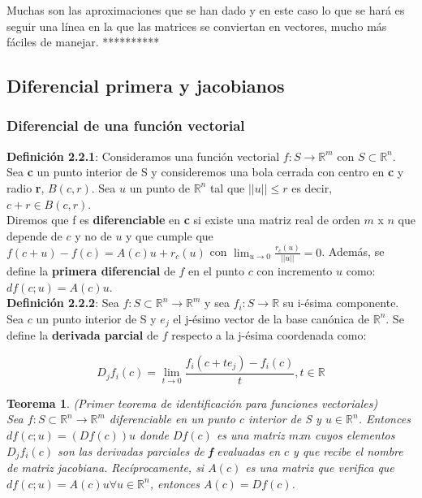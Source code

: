 \documentclass{article}
\theoremstyle{theorem-style}  %
\newtheorem{theorem}{Teorema}[section]  %
\theoremstyle{definition}
\theoremstyle{example-style}
\begin{document}
Muchas son las aproximaciones que se han dado y en este caso lo que se hará es seguir una línea en la que las matrices se conviertan en vectores, mucho más fáciles de manejar. **********

\subsection{Diferencial primera y jacobianos}

\subsubsection{Diferencial de una función vectorial}
\textbf{Definición 2.2.1}: Consideramos una función vectorial $f: S \rightarrow \mathbb{R}^m$ con $S\subset \mathbb{R}^n$. Sea \textbf{c} un punto interior de S y consideremos una bola cerrada con centro en \textbf{c} y radio \textbf{r}, $B(c,r)$. Sea $u$ un punto de $\mathbb{R}^n$ tal que $||u||\leq r$ es decir, $c+r \in B(c,r)$. \\
Diremos que f es \textbf{diferenciable} en \textbf{c} si existe una matriz real de orden $m$ x $n$ que depende de $c$ y no de $u$ y que cumple que $f(c+u)-f(c) = A(c)u + r_c(u)$ con $\lim_{u\to0} \frac{r_c(u)}{||u||} = 0$. Además, se define la \textbf{primera diferencial} de $f$ en el punto $c$ con incremento $u$ como: $df(c;u)=A(c)u$.\\

\textbf{Definición 2.2.2}: Sea $f: S\subset \mathbb{R}^n \rightarrow \mathbb{R}^m$ y sea $f_i: S \rightarrow \mathbb{R}$ su i-ésima componente. Sea $c$ un punto interior de S y $e_j$ el j-ésimo vector de la base canónica de $\mathbb{R}^n$. Se define la \textbf{derivada parcial} de $f$ respecto a la j-ésima coordenada como: 

$$ D_jf_i(c) = \lim_{t\to0} \frac{f_i(c + te_j ) - f_i(c)}{t}, t\in \mathbb{R} $$  
 
\begin{theorem} (Primer teorema de identificación para funciones vectoriales)\\
	Sea $f: S\subset \mathbb{R}^n \rightarrow \mathbb{R}^m$ diferenciable en un punto $c$ interior de S y $u  \in \mathbb{R}^n$. Entonces $df(c;u)=(Df(c))u$ donde $Df(c)$ es una matriz $m$x$n$ cuyos elementos $D_jf_i(c)$ son las derivadas parciales de \textbf{f} evaluadas en $c$ y que recibe el nombre de matriz jacobiana. Recíprocamente, si $A(c)$ es una matriz que verifica que $df(c;u)=A(c)u \forall u\in \mathbb{R}^n$, entonces $A(c) = Df(c)$. 
\end{theorem}
\end{document}
